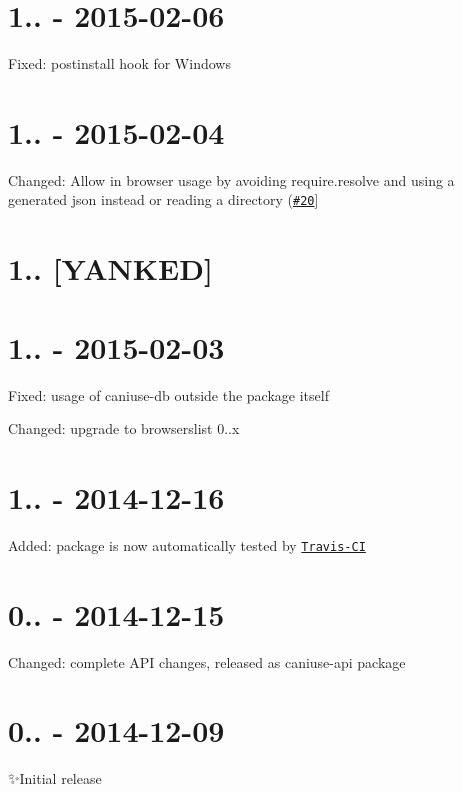 \section*{1.. -\/ 2015-\/02-\/06}


\begin{DoxyItemize}
\item Fixed\+: postinstall hook for Windows
\end{DoxyItemize}

\section*{1.. -\/ 2015-\/02-\/04}


\begin{DoxyItemize}
\item Changed\+: Allow in browser usage by avoiding {\ttfamily require.\+resolve} and using a generated json instead or reading a directory (\href{https://github.com/Nyalab/caniuse-api/pull/20}{\tt \#20}\mbox{]}
\end{DoxyItemize}

\section*{1.. \mbox{[}Y\+A\+N\+K\+ED\mbox{]}}

\section*{1.. -\/ 2015-\/02-\/03}


\begin{DoxyItemize}
\item Fixed\+: usage of caniuse-\/db outside the package itself
\item Changed\+: upgrade to browserslist 0..\+x
\end{DoxyItemize}

\section*{1.. -\/ 2014-\/12-\/16}


\begin{DoxyItemize}
\item Added\+: package is now automatically tested by \href{https://travis-ci.org/Nyalab/caniuse-api}{\tt Travis-\/\+CI}
\end{DoxyItemize}

\section*{0.. -\/ 2014-\/12-\/15}


\begin{DoxyItemize}
\item Changed\+: complete A\+PI changes, released as {\ttfamily caniuse-\/api} package
\end{DoxyItemize}

\section*{0.. -\/ 2014-\/12-\/09}

✨\+Initial release 